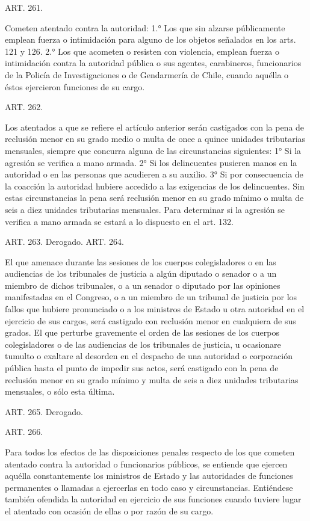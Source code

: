     ART. 261.

    Cometen atentado contra la autoridad:
    1.° Los que sin alzarse públicamente emplean fuerza o intimidación para alguno de los objetos señalados en los arts. 121 y 126.
    2.° Los que acometen o resisten con violencia, emplean fuerza o intimidación contra la autoridad pública o sus agentes, carabineros, funcionarios de la Policía de Investigaciones o de Gendarmería de Chile, cuando aquélla o éstos ejercieron funciones de su cargo.


    ART. 262.

    Los atentados a que se refiere el artículo anterior serán castigados con la pena de reclusión menor en su grado medio o multa de once a quince unidades tributarias mensuales, siempre que concurra alguna de las circunstancias siguientes:
    1° Si la agresión se verifica a mano armada.
    2° Si los delincuentes pusieren manos en la autoridad o en las personas que acudieren a su auxilio.
    3° Si por consecuencia de la coacción la autoridad hubiere accedido a las exigencias de los delincuentes.
    Sin estas circunstancias la pena será reclusión menor en su grado mínimo o multa de seis a diez unidades tributarias mensuales.
    Para determinar si la agresión se verifica a mano armada se estará a lo dispuesto en el art. 132.



    ART. 263. Derogado.
    ART. 264.

    El que amenace durante las sesiones de los cuerpos colegisladores o en las audiencias de los tribunales de justicia a algún diputado o senador o a un miembro de dichos tribunales, o a un senador o diputado por las opiniones manifestadas en el Congreso, o a un miembro de un tribunal de justicia por los fallos que hubiere pronunciado o a los ministros de Estado u otra autoridad en el ejercicio de sus cargos, será castigado con reclusión menor en cualquiera de sus grados.
    El que perturbe gravemente el orden de las sesiones de los cuerpos colegisladores o de las audiencias de los tribunales de justicia, u ocasionare tumulto o exaltare al desorden en el despacho de una autoridad o corporación pública hasta el punto de impedir sus actos, será castigado con la pena de reclusión menor en su grado mínimo y multa de seis a diez unidades tributarias mensuales, o sólo esta última.


    ART. 265. Derogado.

    ART. 266.

    Para todos los efectos de las disposiciones penales respecto de los que cometen atentado contra la autoridad o funcionarios públicos, se entiende que ejercen aquélla constantemente los ministros de Estado y las autoridades de funciones permanentes o llamadas a ejercerlas en todo caso y circunstancias.
    Entiéndese también ofendida la autoridad en ejercicio de sus funciones cuando tuviere lugar el atentado con ocasión de ellas o por razón de su cargo.




